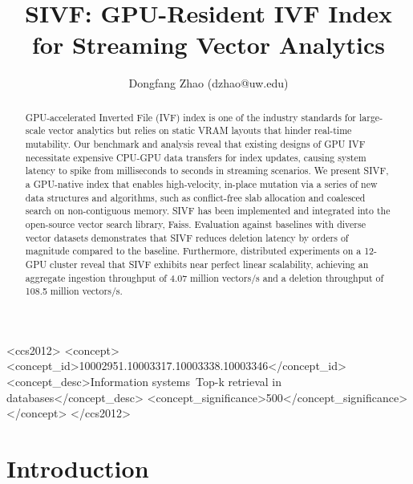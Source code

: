 \documentclass[sigconf,nonacm]{acmart}
\theoremstyle{plain}
\theoremstyle{definition}
\theoremstyle{remark}
\begin{document}
\title{SIVF: GPU-Resident IVF Index for Streaming Vector Analytics}

\author{Dongfang Zhao (dzhao@uw.edu)}

\begin{abstract}
GPU-accelerated Inverted File (IVF) index is one of the industry standards for large-scale vector analytics but relies on static VRAM layouts that hinder real-time mutability. Our benchmark and analysis reveal that existing designs of GPU IVF necessitate expensive CPU-GPU data transfers for index updates, causing system latency to spike from milliseconds to seconds in streaming scenarios. We present SIVF, a GPU-native index that enables high-velocity, in-place mutation via a series of new data structures and algorithms, such as conflict-free slab allocation and coalesced search on non-contiguous memory. SIVF has been implemented and integrated into the open-source vector search library, Faiss. Evaluation against baselines with diverse vector datasets demonstrates that SIVF reduces deletion latency by orders of magnitude compared to the baseline. Furthermore, distributed experiments on a 12-GPU cluster reveal that SIVF exhibits near perfect linear scalability, achieving an aggregate ingestion throughput of 4.07 million vectors/s and a deletion throughput of 108.5 million vectors/s.
\end{abstract}
\maketitle


\begin{CCSXML}
<ccs2012>
   <concept>
       <concept_id>10002951.10003317.10003338.10003346</concept_id>
       <concept_desc>Information systems~Top-k retrieval in databases</concept_desc>
       <concept_significance>500</concept_significance>
       </concept>
 </ccs2012>
\end{CCSXML}


\section{Introduction}
\end{document}

